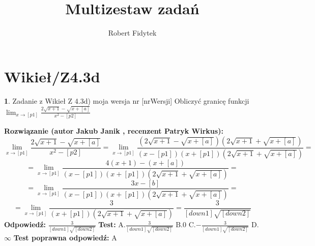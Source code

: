 \documentclass[12pt, a4paper]{article}
\title{Multizestaw zadań}
\author{Robert Fidytek}
\date{}
\theoremstyle{definition} %
\newtheorem{zad}{}
\newcommand{\kategoria}[1]{\section{#1}} %
\newcommand{\zadStart}[1]{\begin{zad}#1\newline} %
\newcommand{\zadStop}{\end{zad}}   %
\newcommand{\rozwStart}[2]{\noindent \textbf{Rozwiązanie (autor #1 , recenzent #2): }\newline} %
\newcommand{\rozwStop}{\newline}                                            %
\newcommand{\odpStart}{\noindent \textbf{Odpowiedź:}\newline}    %
\newcommand{\odpStop}{\newline}                                             %
\newcommand{\testStart}{\noindent \textbf{Test:}\newline} %
\newcommand{\testStop}{\newline} %
\newcommand{\kluczStart}{\noindent \textbf{Test poprawna odpowiedź:}\newline} %
\newcommand{\kluczStop}{\newline} %
\begin{document}
\maketitle


\kategoria{Wikieł/Z4.3d}
\zadStart{Zadanie z Wikieł Z 4.3d) moja wersja nr [nrWersji]}
Obliczyć granicę funkcji $\lim_{x \to [p1]} \frac{2\sqrt{x+1}-\sqrt{x+[a]}}{x^2-[p2]}$
\zadStop
\rozwStart{Jakub Janik}{Patryk Wirkus}
$$\lim_{x \to [p1]} \frac{2\sqrt{x+1}-\sqrt{x+[a]}}{x^2-[p2]}=\lim_{x \to [p1]} \frac{(2\sqrt{x+1}-\sqrt{x+[a]})(2\sqrt{x+1}+\sqrt{x+[a]})}{(x-[p1])(x+[p1])(2\sqrt{x+1}+\sqrt{x+[a]})}=$$
$$=\lim_{x \to [p1]} \frac{4(x+1)-(x+[a])}{(x-[p1])(x+[p1])(2\sqrt{x+1}+\sqrt{x+[a]})}=$$
$$=\lim_{x \to [p1]} \frac{3x-[b]}{(x-[p1])(x+[p1])(2\sqrt{x+1}+\sqrt{x+[a]})}=$$
$$=\lim_{x \to [p1]} \frac{3}{(x+[p1])(2\sqrt{x+1}+\sqrt{x+[a]})}=\frac{3}{[down1]\sqrt{[down2]}}$$
\rozwStop
\odpStart
$\frac{3}{[down1]\sqrt{[down2]}}$
\odpStop
\testStart
A.$\frac{3}{[down1]\sqrt{[down2]}}$
B.$0$
C.$-\frac{3}{[down1]\sqrt{[down2]}}$
D.$\infty$
\testStop
\kluczStart
A
\kluczStop
\end{document}

